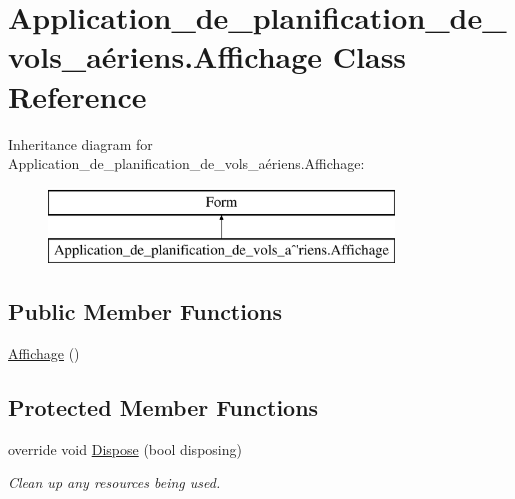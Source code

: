 \hypertarget{class_application__de__planification__de__vols__a_xC3_xA9riens_1_1_affichage}{}\section{Application\+\_\+de\+\_\+planification\+\_\+de\+\_\+vols\+\_\+aériens.\+Affichage Class Reference}
\label{class_application__de__planification__de__vols__a_xC3_xA9riens_1_1_affichage}
Inheritance diagram for Application\+\_\+de\+\_\+planification\+\_\+de\+\_\+vols\+\_\+aériens.\+Affichage\+:\begin{figure}[H]
\begin{center}
\leavevmode
\includegraphics[height=2.000000cm]{class_application__de__planification__de__vols__a_xC3_xA9riens_1_1_affichage}
\end{center}
\end{figure}
\subsection*{Public Member Functions}
\begin{DoxyCompactItemize}
\item 
\hyperlink{class_application__de__planification__de__vols__a_xC3_xA9riens_1_1_affichage_a224f6dc223876b40e7ae776207a269b7}{Affichage} ()
\end{DoxyCompactItemize}
\subsection*{Protected Member Functions}
\begin{DoxyCompactItemize}
\item 
override void \hyperlink{class_application__de__planification__de__vols__a_xC3_xA9riens_1_1_affichage_addb34a9fdcc33294a51e6b0012ab89a7}{Dispose} (bool disposing)
\begin{DoxyCompactList}\small\item\em Clean up any resources being used. \end{DoxyCompactList}\end{DoxyCompactItemize}


